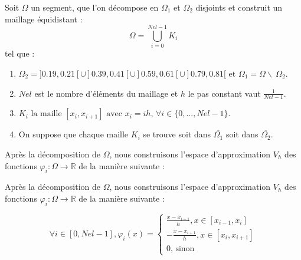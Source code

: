 \documentclass[12pt]{article}
\begin{document}
Soit $\Omega $ un segment, que l'on décompose en $\Omega_{1}$ et 
$\Omega_{2}$ disjoints et construit un maillage équidistant : $$ \Omega = 
\bigcup_{i =0} ^{Nel - 1} K_i $$ 
tel que :
\begin{enumerate}
 \item $\Omega_2 = ]0.19,0.21[\cup]0.39,0.41[\cup]0.59,0.61[\cup]0.79,0.81[\text{ et } \Omega_{1} = \Omega \backslash\ \Omega_{2}$.
 \item $Nel$ est le nombre d'éléments du maillage et $h$ le pas constant vaut $ \frac{1}{Nel - 1}$.
 \item $ K_i \text{ la maille } [x_i, x_{i+1}] \text{ avec } x_i = ih \text{, } \forall i \in \{0,..., Nel-1 \}$.
 \item On suppose que chaque maille $K_i$ se trouve soit dans $\overline{\Omega_1}$ soit dans $\overline{\Omega_2}$.
\end{enumerate}

 
\begin{comment}
Après la décomposition de $\Omega$, nous définissons l’élément fini $(K_i,P_{K_{i}},\Sigma_{K_{i}})$ avec $\Sigma_{K_{i}} = \{ x_{i-1},x_{i} \}  \text{ et }  P_{K_{i}} = P^{1}(K_{i})$ et les fonctions de base sont alors:
$$ p_{x_{i}} = \frac{x- x_{i+1}}{x_{i} - x_{i+1}}  \text{ et } p_{x_{i+1}} = \frac{x- x_{i}}{x_{i+1} - x_{i}}$$

 \noindent Puis, nous construisons l’espace d’approximation $V_h$ des fonctions $\varphi_{i} : \Omega \longrightarrow \mathbb{R}$ de la manière 
suivante :
\end{comment}


Après la décomposition de $\Omega$, nous construisons l’espace d’approximation $V_h$ des fonctions $\varphi_{i} : \Omega \longrightarrow \mathbb{R}$ de la manière suivante :

 \noindent Après la décomposition de $\Omega$, nous construisons l’espace d’approximation $V_h$ des fonctions $\varphi_{i} : \Omega \longrightarrow \mathbb{R}$ de la manière 
suivante :

$$
\forall i \in [0,Nel-1], 
\varphi_{i} (x) = 
\begin{cases}
\frac{x-x_{i-1}}{h}, x \in [x_{i-1}, x_{i}]\\
-\frac{x-x_{i+1}}{h}, x \in [x_{i}, x_{i+1}] \\
0 \text{, sinon}
\end{cases}
$$



\end{document}
